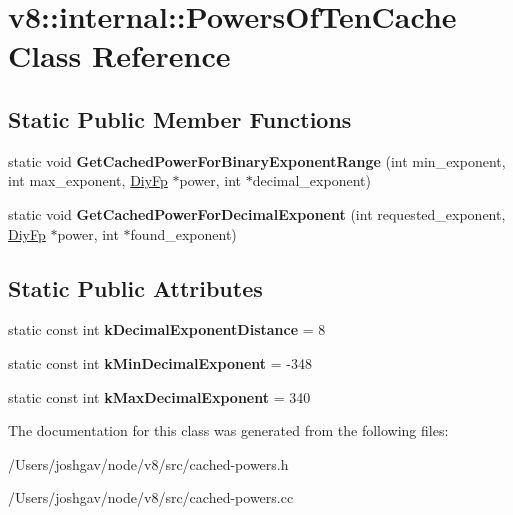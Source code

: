 \hypertarget{classv8_1_1internal_1_1_powers_of_ten_cache}{}\section{v8\+:\+:internal\+:\+:Powers\+Of\+Ten\+Cache Class Reference}
\label{classv8_1_1internal_1_1_powers_of_ten_cache}
\subsection*{Static Public Member Functions}
\begin{DoxyCompactItemize}
\item 
static void {\bfseries Get\+Cached\+Power\+For\+Binary\+Exponent\+Range} (int min\+\_\+exponent, int max\+\_\+exponent, \hyperlink{classv8_1_1internal_1_1_diy_fp}{Diy\+Fp} $\ast$power, int $\ast$decimal\+\_\+exponent)\hypertarget{classv8_1_1internal_1_1_powers_of_ten_cache_a6540b66a9cbfa1a641495b4210e48980}{}\label{classv8_1_1internal_1_1_powers_of_ten_cache_a6540b66a9cbfa1a641495b4210e48980}

\item 
static void {\bfseries Get\+Cached\+Power\+For\+Decimal\+Exponent} (int requested\+\_\+exponent, \hyperlink{classv8_1_1internal_1_1_diy_fp}{Diy\+Fp} $\ast$power, int $\ast$found\+\_\+exponent)\hypertarget{classv8_1_1internal_1_1_powers_of_ten_cache_ab5f115d74ae1d59957740e6b32e7be35}{}\label{classv8_1_1internal_1_1_powers_of_ten_cache_ab5f115d74ae1d59957740e6b32e7be35}

\end{DoxyCompactItemize}
\subsection*{Static Public Attributes}
\begin{DoxyCompactItemize}
\item 
static const int {\bfseries k\+Decimal\+Exponent\+Distance} = 8\hypertarget{classv8_1_1internal_1_1_powers_of_ten_cache_a329c4f9bb31d4843a1c78de73c1b46a2}{}\label{classv8_1_1internal_1_1_powers_of_ten_cache_a329c4f9bb31d4843a1c78de73c1b46a2}

\item 
static const int {\bfseries k\+Min\+Decimal\+Exponent} = -\/348\hypertarget{classv8_1_1internal_1_1_powers_of_ten_cache_a0da8d97277aecd957197313bb1e9cc63}{}\label{classv8_1_1internal_1_1_powers_of_ten_cache_a0da8d97277aecd957197313bb1e9cc63}

\item 
static const int {\bfseries k\+Max\+Decimal\+Exponent} = 340\hypertarget{classv8_1_1internal_1_1_powers_of_ten_cache_a5e7db658341c32ff29a88f3b893ad20e}{}\label{classv8_1_1internal_1_1_powers_of_ten_cache_a5e7db658341c32ff29a88f3b893ad20e}

\end{DoxyCompactItemize}


The documentation for this class was generated from the following files\+:\begin{DoxyCompactItemize}
\item 
/\+Users/joshgav/node/v8/src/cached-\/powers.\+h\item 
/\+Users/joshgav/node/v8/src/cached-\/powers.\+cc\end{DoxyCompactItemize}
